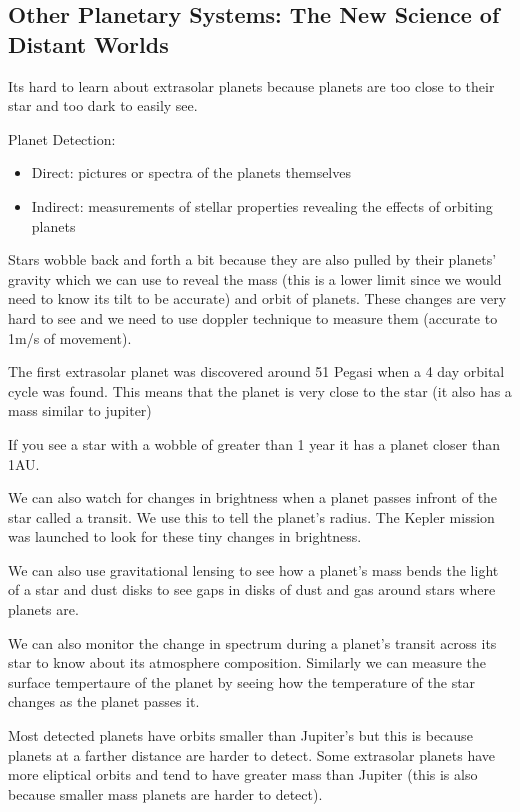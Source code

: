\subsection{Other Planetary Systems: The New Science of Distant Worlds}
Its hard to learn about extrasolar planets because planets are too close to their star and too dark to easily see.

Planet Detection:
\begin{itemize}
\item Direct: pictures or spectra of the planets themselves
\item Indirect: measurements of stellar properties revealing the effects of orbiting planets
\end{itemize}

Stars wobble back and forth a bit because they are also pulled by their planets' gravity which we can use to reveal the mass (this is a lower limit since we would need to know its tilt to be accurate) and orbit of planets. These changes are very hard to see and we need to use doppler technique to measure them (accurate to 1m/s of movement).

The first extrasolar planet was discovered around 51 Pegasi when a 4 day orbital cycle was found. This means that the planet is very close to the star (it also has a mass similar to jupiter)

If you see a star with a wobble of greater than 1 year it has a planet closer than 1AU.

We can also watch for changes in brightness when a planet passes infront of the star called a transit. We use this to tell the planet's radius. The Kepler mission was launched to look for these tiny changes in brightness.

We can also use gravitational lensing to see how a planet's mass bends the light of a star and dust disks to see gaps in disks of dust and gas around stars where planets are.

We can also monitor the change in spectrum during a planet's transit across its star to know about its atmosphere composition. Similarly we can measure the surface tempertaure of the planet by seeing how the temperature of the star changes as the planet passes it.

Most detected planets have orbits smaller than Jupiter's but this is because planets at a farther distance are harder to detect. Some extrasolar planets have more eliptical orbits and tend to have greater mass than Jupiter (this is also because smaller mass planets are harder to detect).

